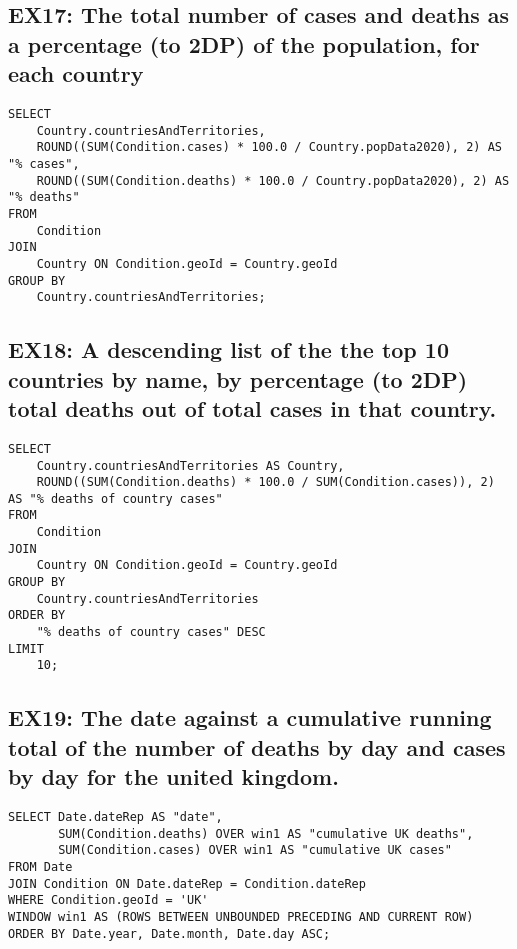 \documentclass{article}
\begin{document}
\subsection*{EX17: The total number of cases and deaths as a percentage (to 2DP) of the population, for each country}
\begin{verbatim}
SELECT
    Country.countriesAndTerritories,
    ROUND((SUM(Condition.cases) * 100.0 / Country.popData2020), 2) AS "% cases",
    ROUND((SUM(Condition.deaths) * 100.0 / Country.popData2020), 2) AS "% deaths"
FROM
    Condition
JOIN
    Country ON Condition.geoId = Country.geoId
GROUP BY
    Country.countriesAndTerritories;
\end{verbatim}

\subsection*{EX18: A descending list of the the top 10 countries by name, by percentage (to 2DP) total deaths out of total cases in that country.}
\begin{verbatim}
SELECT
    Country.countriesAndTerritories AS Country,
    ROUND((SUM(Condition.deaths) * 100.0 / SUM(Condition.cases)), 2) AS "% deaths of country cases"
FROM
    Condition
JOIN
    Country ON Condition.geoId = Country.geoId
GROUP BY
    Country.countriesAndTerritories
ORDER BY
    "% deaths of country cases" DESC
LIMIT
    10;
\end{verbatim}

\subsection*{EX19: The date against a cumulative running total of the number of deaths by day and cases by day for the united kingdom.}
\begin{verbatim}
SELECT Date.dateRep AS "date",
       SUM(Condition.deaths) OVER win1 AS "cumulative UK deaths",
       SUM(Condition.cases) OVER win1 AS "cumulative UK cases"
FROM Date
JOIN Condition ON Date.dateRep = Condition.dateRep
WHERE Condition.geoId = 'UK'
WINDOW win1 AS (ROWS BETWEEN UNBOUNDED PRECEDING AND CURRENT ROW)
ORDER BY Date.year, Date.month, Date.day ASC;
\end{verbatim}
\end{document}
